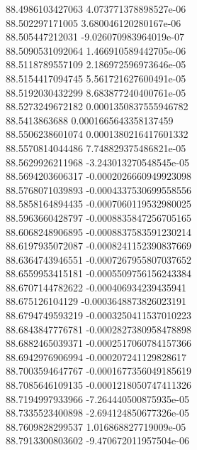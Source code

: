 {88.4986103427063 4.073771378898527e-06 \\
88.502297171005 3.680046120280167e-06 \\
88.505447212031 -9.026070983964019e-07 \\
88.5090531092064 1.466910589442705e-06 \\
88.5118789557109 2.186972596973646e-05 \\
88.5154417094745 5.561721627600491e-05 \\
88.5192030432299 8.683877240400761e-05 \\
88.5273249672182 0.0001350837555946782 \\
88.5413863688 0.0001665643358137459 \\
88.5506238601074 0.0001380216417601332 \\
88.5570814044486 7.748829375486821e-05 \\
88.5629926211968 -3.243013270548545e-05 \\
88.5694203606317 -0.0002026660949923098 \\
88.5768071039893 -0.0004337530699558556 \\
88.5858164894435 -0.0007060119532980025 \\
88.5963660428797 -0.0008835847256705165 \\
88.6068248906895 -0.0008837583591230214 \\
88.6197935072087 -0.0008241152390837669 \\
88.6364743946551 -0.0007267955807037652 \\
88.6559953415181 -0.0005509756156243384 \\
88.6707144782622 -0.000406934239435941 \\
88.675126104129 -0.0003648873826023191 \\
88.6794749593219 -0.0003250411537010223 \\
88.6843847776781 -0.0002827380958478898 \\
88.6882465039371 -0.0002517060784157366 \\
88.6942976906994 -0.000207241129828617 \\
88.7003594647767 -0.0001677356049185619 \\
88.7085646109135 -0.0001218050747411326 \\
88.7194997933966 -7.264440500875935e-05 \\
88.7335523400898 -2.694124850677326e-05 \\
88.7609828299537 1.016868827719009e-05 \\
88.7913300803602 -9.470672011957504e-06 \\
}
